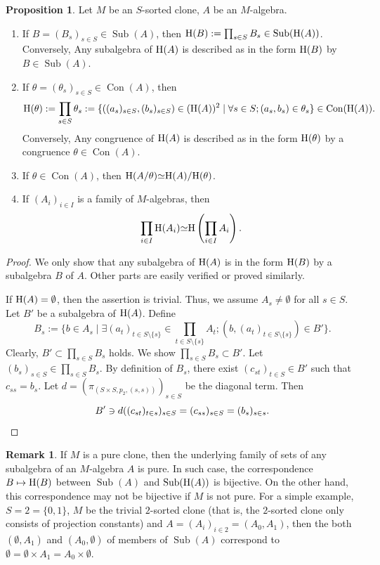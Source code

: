 \documentclass[a4paper,10pt]{article}
\theoremstyle{definition}
\newtheorem{prop}[df]{Proposition}
\newtheorem{rem}[df]{Remark}
\newcommand\iso{{\simeq}}
\newcommand\sm{\setminus}
\DeclareMathOperator{\Con}{Con}
\DeclareMathOperator{\Sub}{Sub}
\begin{document}
\begin{prop}\label{sub-con-corresopndence}
Let $M$ be an $S$-sorted clone, $A$ be an $M$-algebra.
\begin{enumerate}
\item
If $B=(B_s)_{s\in S}\in \Sub(A)$, then ${\rm H}(B):=\prod_{s\in S}B_s\in \Sub({\rm H}(A))$.
Conversely, Any subalgebra of ${\rm H}(A)$ is described as in the form
${\rm H}(B)$ by $B\in\Sub(A)$.
\item
If $\theta=(\theta_s)_{s\in S}\in\Con(A)$, then
\[
{\rm H}(\theta):=\prod_{s\in S}\theta_s
:=\{((a_s)_{s\in S},(b_s)_{s\in S})\in ({\rm H}(A))^2\mid
 \forall s\in S;(a_s,b_s)\in\theta_s\} \in\Con({\rm H}(A)).
\]
Conversely, Any congruence of ${\rm H}(A)$ is described as in the form
${\rm H}(\theta)$ by a congruence $\theta\in\Con(A)$.
\item
If $\theta\in \Con(A)$, then ${\rm H}(A/\theta)\iso {\rm H}(A)/{\rm H}(\theta)$.
\item
If $(A_i)_{i\in I}$ is a family of $M$-algebras, then
\[
\prod_{i\in I}{\rm H}(A_i)\iso {\rm H}\left(\prod_{i\in I} A_i\right).
\]
\end{enumerate}
\end{prop}
\begin{proof}
We only show that any subalgebra of ${\rm H}(A)$ is in the form ${\rm H}(B)$ by
a subalgebra $B$ of $A$.
Other parts are easily verified or proved similarly.

If ${\rm H}(A)= \emptyset$, then the assertion is trivial.
Thus, we assume $A_s\neq\emptyset$ for all $s\in S$.
Let $B'$ be a subalgebra of ${\rm H}(A)$. Define
\[
B_s:=\{b\in A_s\mid\exists (a_t)_{t\in S\sm\{s\}}\in\prod_{t\in S\sm\{s\}}A_t; (b,(a_t)_{t\in S\sm\{s\}})\in B'\}.
\]
Clearly, $B'\subset \prod_{s\in S}B_s$ holds. We show $\prod_{s\in S}B_s\subset B'$.
Let $(b_s)_{s\in S}\in \prod_{s\in S}B_s$. By definition of $B_s$,
there exist $(c_{st})_{t\in S}\in B'$ such that $c_{ss}=b_s$.
Let $d=(\pi_{(S\times S,p_2,(s,s))})_{s\in S}$ be the diagonal term. Then
\[
B'\ni d((c_{st})_{t\in s})_{s\in S}=(c_{ss})_{s\in S}=(b_s)_{s\in s}.
\qedhere
\]
\end{proof}

\begin{rem}\label{subalgebra-of-pure-algebra}
If $M$ is a pure clone, then the underlying family of sets of any subalgebra of an $M$-algebra $A$ is pure. In such case, the correspondence $B\mapsto {\rm H}(B)$
between $\Sub(A)$ and $\Sub({\rm H}(A))$ is bijective. On the other hand,
this correspondence may not be bijective if $M$ is not pure.
For a simple example, $S=2=\{0,1\}$, $M$ be the trivial $2$-sorted clone
(that is, the $2$-sorted clone only consists of projection constants)
and $A=(A_i)_{i\in 2}=(A_0,A_1)$, then the both $(\emptyset,A_1)$ and $(A_0,\emptyset)$
of members of $\Sub(A)$ correspond to $\emptyset=\emptyset\times A_1=A_0\times\emptyset$.
\end{rem}
\end{document}
